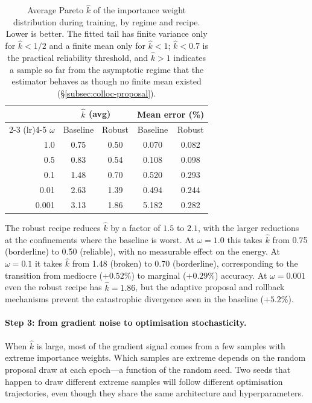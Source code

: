 \begin{table}[htbp]
  \centering
  \caption[Pareto $\hat{k}$ by regime and recipe]{Average Pareto $\hat{k}$ of the importance
  weight distribution during training, by regime and recipe. Lower is better. The fitted
  tail has finite variance only for $\hat k<1/2$ and a finite mean only for $\hat k<1$;
  $\hat k<0.7$ is the practical reliability threshold, and $\hat k>1$ indicates a sample so
  far from the asymptotic regime that the estimator behaves as though no finite mean existed
  (\S\ref{subsec:colloc-proposal}).}
  \label{tab:khat-regime}
  \small
  \begin{tabular}{r cc cc}
    \toprule
    & \multicolumn{2}{c}{$\hat{k}$ (avg)} & \multicolumn{2}{c}{Mean error (\%)} \\
    \cmidrule(lr){2-3} \cmidrule(lr){4-5}
    $\omega$ & Baseline & Robust & Baseline & Robust \\
    \midrule
    1.0   & 0.75 & 0.50 & 0.070 & 0.082 \\
    0.5   & 0.83 & 0.54 & 0.108 & 0.098 \\
    0.1   & 1.48 & 0.70 & 0.520 & 0.293 \\
    0.01  & 2.63 & 1.39 & 0.494 & 0.244 \\
    0.001 & 3.13 & 1.86 & 5.182 & 0.282 \\
    \bottomrule
  \end{tabular}
\end{table}

The robust recipe reduces $\hat{k}$ by a factor of $1.5$ to $2.1$, with the larger
reductions at the confinements where the baseline is worst.
At $\omega{=}1.0$ this takes $\hat{k}$ from 0.75 (borderline) to
0.50 (reliable), with no measurable effect on the energy.
At $\omega{=}0.1$ it takes $\hat{k}$ from 1.48 (broken) to 0.70
(borderline), corresponding to the transition from mediocre
($+0.52\%$) to marginal ($+0.29\%$) accuracy.
At $\omega{=}0.001$ even the robust recipe has $\hat{k}{=}1.86$,
but the adaptive proposal and rollback mechanisms prevent the
catastrophic divergence seen in the baseline ($+5.2\%$).

\paragraph{Step 3: from gradient noise to optimisation stochasticity.}
When $\hat{k}$ is large, most of the gradient signal comes from a
few samples with extreme importance weights.
Which samples are extreme depends on the random proposal draw at
each epoch---a function of the random seed.
Two seeds that happen to draw different extreme samples will follow
different optimisation trajectories, even though they share the same
architecture and hyperparameters.

